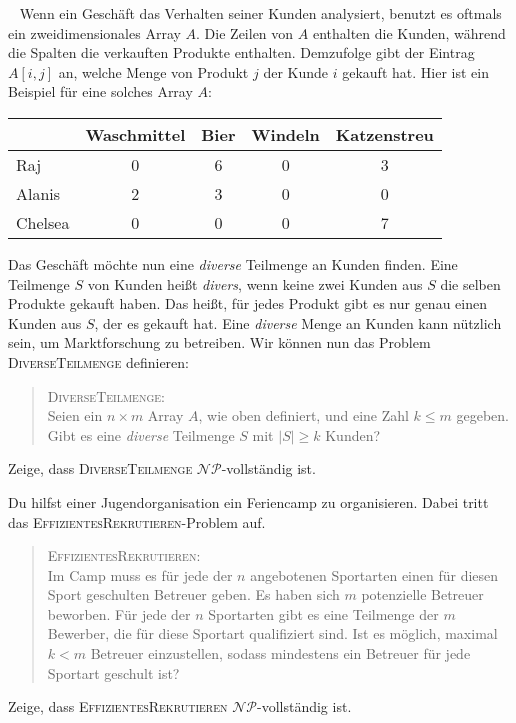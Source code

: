 \documentclass{uebung_cs}
\begin{document}
\begin{aufgabe}[Kundenanalyse]\
	Wenn ein Geschäft das Verhalten seiner Kunden analysiert, benutzt es oftmals ein zweidimensionales Array $A$. Die Zeilen von $A$ enthalten die Kunden, während die Spalten die verkauften Produkte enthalten. Demzufolge gibt der Eintrag $A[i,j]$ an, welche Menge von Produkt $j$ der Kunde $i$ gekauft hat. Hier ist ein Beispiel für eine solches Array $A$:
	
	\begin{center}
	\begin{tabular}{l c c c c}
	\hline 
	& Waschmittel & Bier & Windeln & Katzenstreu \\ 
	\hline 
	Raj & 0 & 6 & 0 & 3 \\ 
	Alanis & 2 & 3 & 0 & 0 \\ 
	Chelsea & 0 & 0 & 0 & 7 \\ 
	\hline 
	\end{tabular} 
	\end{center}
	
	Das Geschäft möchte nun eine \textit{diverse} Teilmenge an Kunden finden. Eine Teilmenge $S$ von Kunden heißt \textit{divers}, wenn keine zwei Kunden aus $S$ die selben Produkte gekauft haben. Das heißt, für jedes Produkt gibt es nur genau einen Kunden aus $S$, der es gekauft hat. Eine \textit{diverse} Menge an Kunden kann nützlich sein, um Marktforschung zu betreiben. Wir können nun das Problem \textsc{DiverseTeilmenge} definieren:
	\begin{quote}
		\textsc{DiverseTeilmenge}:\\
		Seien ein $n \times m$ Array $A$, wie oben definiert, und eine Zahl $k \leq m$ gegeben. Gibt es eine \textit{diverse} Teilmenge $S$ mit $|S| \geq k$ Kunden?
	\end{quote}
	Zeige, dass \textsc{DiverseTeilmenge} $\mathcal{NP}$-vollständig ist.
\end{aufgabe}    

\begin{aufgabe}[Feriencamp]
	Du hilfst einer Jugendorganisation ein Feriencamp zu organisieren. Dabei tritt das \textsc{EffizientesRekrutieren}-Problem auf.
	\begin{quote}
		\textsc{EffizientesRekrutieren}:\\
		Im Camp muss es für jede der $n$ angebotenen Sportarten einen für diesen Sport geschulten Betreuer geben. Es haben sich $m$ potenzielle Betreuer beworben. Für jede der $n$ Sportarten gibt es eine Teilmenge der $m$ Bewerber, die für diese Sportart qualifiziert sind. Ist es möglich, maximal $k < m$ Betreuer einzustellen, sodass mindestens ein Betreuer für jede Sportart geschult ist?
	\end{quote}	 
	
	Zeige, dass \textsc{EffizientesRekrutieren} $\mathcal{NP}$-vollständig ist.
\end{aufgabe}
\end{document}
